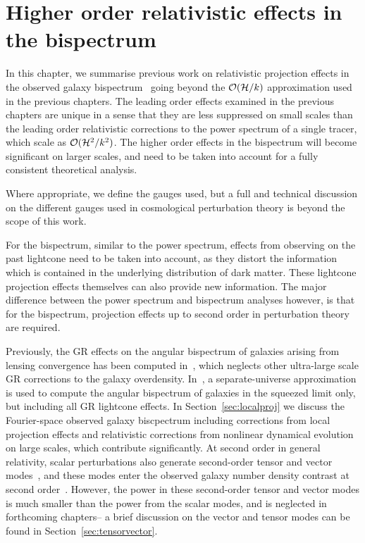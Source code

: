 
\chapter{Higher order relativistic effects in the bispectrum}
\label{chapter:ho}

In this chapter, we summarise previous work on relativistic projection effects in the observed galaxy bispectrum~\cite{Umeh:2016nuh,Jolicoeur:2017nyt,Jolicoeur:2017eyi,Jolicoeur:2018blf} going beyond the $\mathcal{O}(\mathcal{H}/k)$ approximation used in the previous chapters. The leading order effects examined in the previous chapters are unique in a sense that they are less suppressed on small scales than the leading order relativistic corrections to the power spectrum of a single tracer, which scale as $\mathcal{O}(\mathcal{H}^2/k^2)$. The higher order effects in the bispectrum will become significant on larger scales, and need to be taken into account for a fully consistent theoretical analysis.

Where appropriate, we define the gauges used, but a full and technical discussion on the different gauges used in cosmological perturbation theory is beyond the scope of this work.

For the bispectrum, similar to the power spectrum, effects from observing on the past lightcone need to be taken into account, as they distort the information which is contained in the underlying distribution of dark matter. These lightcone projection effects themselves can also provide new information. The major difference between the power spectrum and bispectrum analyses however, is that for the bispectrum, projection effects up to second order in perturbation theory are required. 

Previously, the GR effects on the angular bispectrum of galaxies arising from lensing convergence has been computed in~\cite{DiDio:2015bua}, which neglects other ultra-large scale GR corrections to the galaxy overdensity. In~\cite{Kehagias:2015tda}, a separate-universe approximation is used to compute the angular bispectrum of galaxies in the squeezed limit only, but including all GR lightcone effects. In Section~\ref{sec:localproj} we discuss the Fourier-space observed galaxy biscpectrum including corrections from local projection effects and relativistic corrections from nonlinear dynamical evolution on large scales, which contribute significantly. At second order in general relativity, scalar perturbations also generate second-order tensor and vector modes~\cite{Mollerach:1997up,Matarrese:1997ay}, and these modes enter the observed galaxy number density contrast at second order~\cite{Bertacca:2014hwa,Bertacca:2014wga,Bertacca:2014dra,Yoo:2014sfa,DiDio:2014lka}. However, the power in these second-order tensor and vector modes is much smaller than the power from the scalar modes, and is neglected in forthcoming chapters-- a brief discussion on the vector and tensor modes can be found in Section~\ref{sec:tensorvector}. 

